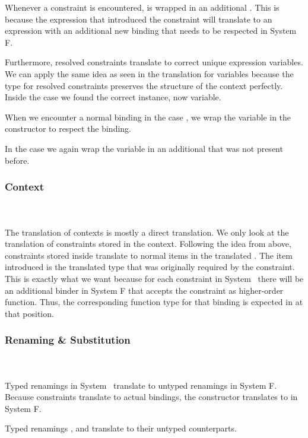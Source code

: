 \noindent Whenever a constraint is encountered,  is wrapped in an additional . 
This is because the expression that introduced the constraint will translate to an expression with an additional new binding that needs to be respected in System F.

\noindent Furthermore, resolved constraints translate to correct unique expression variables. We can apply the same idea as seen in the translation for variables because the type for resolved constraints \Data{[}  \Data{]∈}  preserves the structure of the context perfectly. 
\DPTOVar
Inside the case  we found the correct instance, now variable.

\noindent When we encounter a normal binding in the case , we wrap the variable in the  constructor to respect the binding.

\noindent In the case  we again wrap the variable in an additional  that was not present before.
\subsubsection{Context}\hfill\\\\
The translation of contexts is mostly a direct translation. 
We only look at the translation of constraints stored in the context.
\DPTCtx
Following the idea from above, constraints  \Constr{:}  stored inside  translate to normal items in the translated . 
The item introduced is the translated type   that was originally required by the constraint. 
This is exactly what we want because for each constraint in System \Fo\ there will be an additional binder in System F that accepts the constraint as higher-order function. 
Thus, the corresponding function type for that binding is expected in  at that position.

\subsubsection{Renaming \& Substitution}\hfill\\\\
Typed renamings in System \Fo\ translate to untyped renamings in System F.
\DPTRen
\noindent Because constraints translate to actual bindings, the constructor  translates to  in System F.

\noindent Typed renamings ,  and  translate to their untyped counterparts. 

